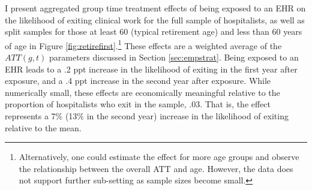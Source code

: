 \documentclass[12pt]{article}
\begin{document}
I present aggregated group time treatment effects of being exposed to an EHR on the likelihood of exiting clinical work for the full sample of hospitalists, as well as split samples for those at least 60 (typical retirement age) and less than 60 years of age in Figure \ref{fig:retirefirst}.\footnote{Alternatively, one could estimate the effect for more age groups and observe the relationship between the overall ATT and age. However, the data does not support further sub-setting as sample sizes become small.} These effects are a weighted average of the $ATT(g,t)$ parameters discussed in Section \ref{sec:empstrat}. Being exposed to an EHR leads to a .2 ppt increase in the likelihood of exiting in the first year after exposure, and a .4 ppt increase in the second year after exposure. While numerically small, these effects are economically meaningful relative to the proportion of hospitalists who exit in the sample, .03. That is, the effect represents a 7\% (13\% in the second year) increase in the likelihood of exiting relative to the mean.   
\end{document}
